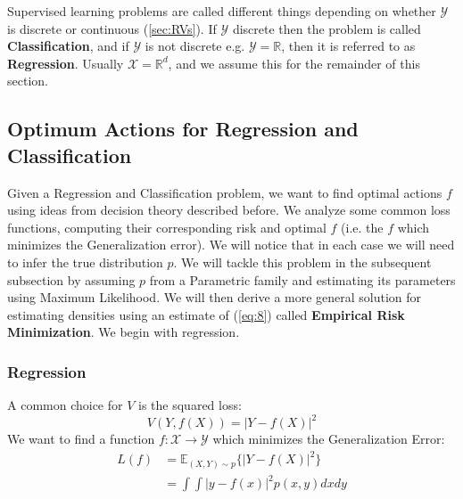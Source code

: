 \documentclass[]{article}
\theoremstyle{mattstyle}
\theoremstyle{definition}
\begin{document}
Supervised learning problems are called different things depending on whether $\mathcal{Y}$ is discrete or continuous (\ref{sec:RVs}). If $\mathcal{Y}$ discrete then the problem is called \textbf{Classification}, and if $\mathcal{Y}$ is not discrete e.g. $\mathcal{Y} = \mathbb{R}$, then it is referred to as \textbf{Regression}. Usually $\mathcal{X} = \mathbb{R}^d$, and we assume this for the remainder of this section.

\subsection{Optimum Actions for Regression and Classification}
Given a Regression and Classification problem, we want to find optimal actions $f$ using ideas from decision theory described before. We analyze some common loss functions, computing their corresponding risk and optimal $f$ (i.e. the $f$ which minimizes the Generalization error). We will notice that in each case we will need to infer the true distribution $p$. We will tackle this problem in the subsequent subsection by assuming $p$ from a Parametric family and estimating its parameters using Maximum Likelihood. We will then derive a more general solution for estimating densities using an estimate of (\ref{eq:8}) called \textbf{Empirical Risk Minimization}. We begin with regression.

\subsubsection{Regression}
A common choice for $V$ is the squared loss: $$V(Y, f(X)) = | Y - f(X) |^2$$
We want to find a function $f: \mathcal{X} \rightarrow \mathcal{Y}$ which minimizes the Generalization Error:
\begin{align*}
L(f) &= \mathbb{E}_{(X,Y)\sim p}\{| Y - f(X) |^2\}\\
&= \int \int | y - f(x) |^2 p(x, y) dx dy
\end{align*}
\end{document}
